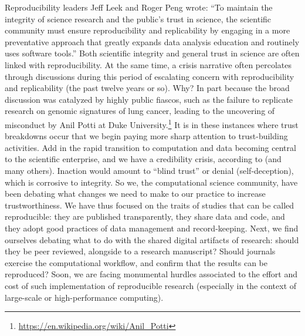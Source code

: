 \documentclass{statement}
\begin{document}
Reproducibility leaders Jeff Leek and Roger Peng wrote: ``To maintain the integrity of science research and the public’s trust in science, the scientific community must ensure reproducibility and replicability by engaging in a more preventative approach that greatly expands data analysis education and routinely uses software tools.'' \citep{leek-peng2015} 
Both scientific integrity and general trust in science are often linked with reproducibility. 
At the same time, a crisis narrative often percolates through discussions during this period of escalating concern with reproducibility and replicability (the past twelve years or so). 
Why? In part because the broad discussion was catalyzed by highly public fiascos, such as the failure to replicate research on genomic signatures of lung cancer, leading to the uncovering of misconduct by Anil Potti at Duke University.\footnote{\url{https://en.wikipedia.org/wiki/Anil\_Potti}} 
It is in these instances where trust breakdowns occur that we begin paying more sharp attention to trust-building activities. 
Add in the rapid transition to computation and data becoming central to the scientific enterprise, and we have a credibility crisis, according to \cite{donoho2009} (and many others). 
Inaction would amount to ``blind trust'' or denial (self-deception), which is corrosive to integrity. 
So we, the computational science community, have been debating what changes we need to make to our practice to increase trustworthiness. 
We have thus focused on the traits of studies that can be called reproducible: they are published transparently, they share data and code, and they adopt good practices of data management and record-keeping. 
Next, we find ourselves debating what to do with the shared digital artifacts of research: should they be peer reviewed, alongside to a research manuscript? 
Should journals exercise the computational workflow, and confirm that the results can be reproduced? 
Soon, we are facing monumental hurdles associated to the effort and cost of such implementation of reproducible research (especially in the context of large-scale or high-performance computing).
\end{document}
